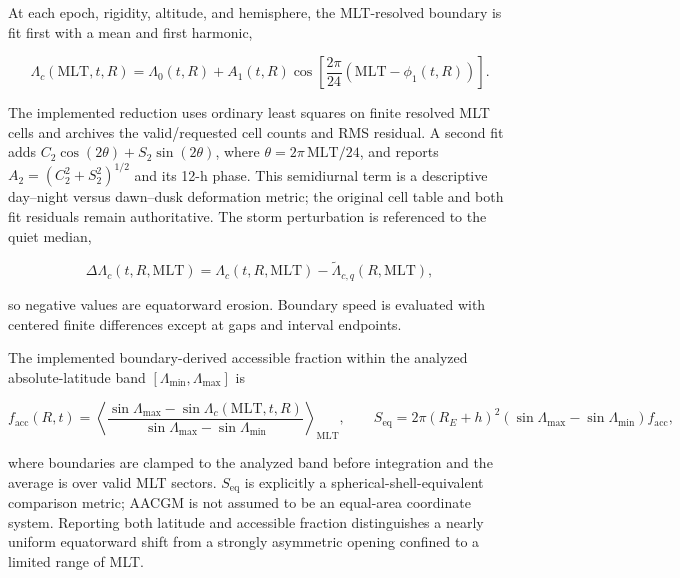 At each epoch, rigidity, altitude, and hemisphere, the MLT-resolved boundary is
fit first with a mean and first harmonic,
\begin{linenomath*}
\begin{equation}
 \Lambda_c(\mathrm{MLT},t,R)=\Lambda_0(t,R)+A_1(t,R)
 \cos\left[\frac{2\pi}{24}\left(\mathrm{MLT}-\phi_1(t,R)\right)\right].
 \label{eq:exp-harmonic}
\end{equation}
\end{linenomath*}
The implemented reduction uses ordinary least squares on finite resolved MLT
cells and archives the valid/requested cell counts and RMS residual. A second
fit adds $C_2\cos(2\theta)+S_2\sin(2\theta)$, where
$\theta=2\pi\,\mathrm{MLT}/24$, and reports
$A_2=(C_2^2+S_2^2)^{1/2}$ and its 12-h phase. This semidiurnal term is a
descriptive day--night versus dawn--dusk deformation metric; the original cell
table and both fit residuals remain authoritative. The storm perturbation is
referenced to the
quiet median,
\begin{linenomath*}
\begin{equation}
 \Delta\Lambda_c(t,R,\mathrm{MLT})=
 \Lambda_c(t,R,\mathrm{MLT})-
 \widetilde{\Lambda}_{c,q}(R,\mathrm{MLT}),
 \label{eq:exp-cutoff-depression}
\end{equation}
\end{linenomath*}
so negative values are equatorward erosion. Boundary speed is evaluated with
centered finite differences except at gaps and interval endpoints.

The implemented boundary-derived accessible fraction within the analyzed
absolute-latitude band $[\Lambda_{\min},\Lambda_{\max}]$ is
\begin{linenomath*}
\begin{equation}
 f_{\mathrm{acc}}(R,t)=\left\langle
 \frac{\sin\Lambda_{\max}-\sin\Lambda_c(\mathrm{MLT},t,R)}
 {\sin\Lambda_{\max}-\sin\Lambda_{\min}}
 \right\rangle_{\mathrm{MLT}},\qquad
 S_{\mathrm{eq}}=2\pi(R_E+h)^2
 (\sin\Lambda_{\max}-\sin\Lambda_{\min})f_{\mathrm{acc}},
 \label{eq:exp-accessible-area}
\end{equation}
\end{linenomath*}
where boundaries are clamped to the analyzed band before integration and the
average is over valid MLT sectors. $S_{\mathrm{eq}}$ is explicitly a
spherical-shell-equivalent comparison metric; AACGM is not assumed to be an
equal-area coordinate system. Reporting both latitude and accessible fraction
distinguishes a nearly uniform equatorward shift from a strongly asymmetric
opening confined to a limited range of MLT.

